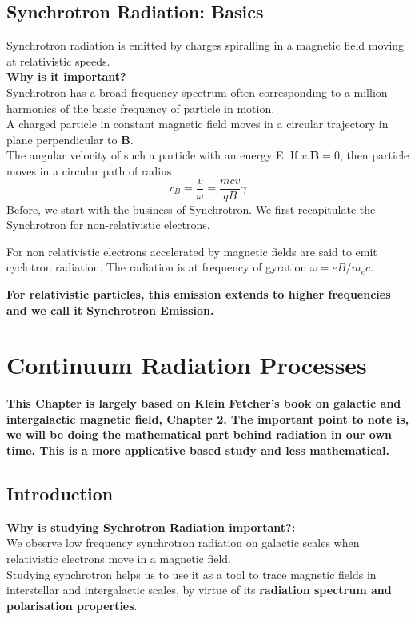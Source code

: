 \documentclass[11pt]{report}
\newcommand{\mbf}[1]{\mathbf{#1}}
\newcommand{\cbox}{tcolorbox}
\begin{document}
\section{Synchrotron Radiation: Basics}
Synchrotron radiation is emitted by charges spiralling in a magnetic field moving at relativistic speeds.\\
\textbf{Why is it important?}\\
Synchrotron has a broad frequency spectrum often corresponding to a million harmonics of the basic frequency of particle in motion.\\


A charged particle in constant magnetic field moves in a circular trajectory in plane perpendicular to $\mbf{B}$.\\
The angular velocity of such a particle with an energy E. If $v.\mbf{B}=0$, then particle moves in a circular path of radius
\begin{equation}
r_B=\frac{v}{\omega}=\frac{mcv}{qB}\gamma
\end{equation}
Before, we start with the business of Synchrotron. We first recapitulate the Synchrotron for non-relativistic electrons. \\

\begin{\cbox}
For non relativistic electrons accelerated by magnetic fields are said to emit cyclotron radiation. The radiation is at frequency of gyration $\omega=eB/m_ec$. 
\end{\cbox}
\textbf{For relativistic particles, this emission extends to higher frequencies and we call it Synchrotron Emission.}

\chapter{Continuum Radiation Processes}
\textbf{This Chapter is largely based on Klein Fetcher's book on galactic and intergalactic magnetic field, Chapter 2. The important point to note is, we will be doing the mathematical part behind radiation in our own time. This is a more applicative based study and less mathematical.}\\
\section{Introduction}
\textbf{Why is studying Sychrotron Radiation important?:}\\
We observe low frequency synchrotron radiation on galactic scales when relativistic electrons move in a magnetic field.\\ 
Studying synchrotron helps us to use it as a tool to trace magnetic fields in interstellar and intergalactic scales, by virtue of its \textbf{radiation spectrum and polarisation properties}.\\
\end{document}
